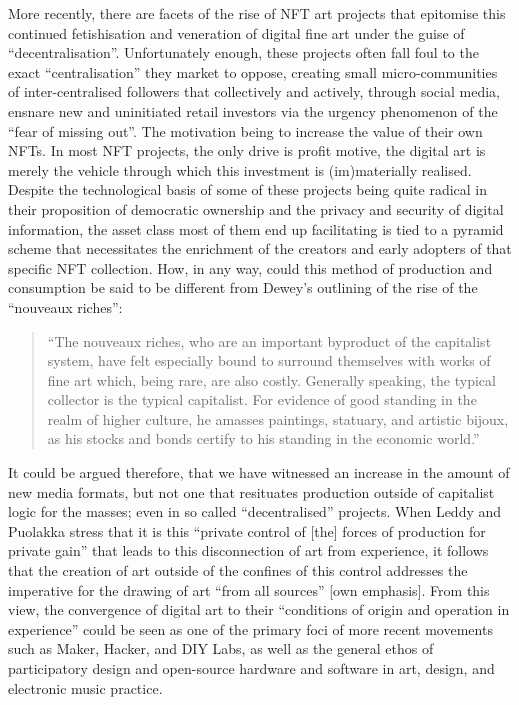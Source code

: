 More recently, there are facets of the rise of NFT art projects that epitomise this continued fetishisation and veneration of digital fine art under the guise of “decentralisation”. Unfortunately enough, these projects often fall foul to the exact “centralisation” they market to oppose, creating small micro-communities of inter-centralised followers that collectively and actively, through social media, ensnare new and uninitiated retail investors via the urgency phenomenon of the “fear of missing out”. The motivation being to increase the value of their own NFTs. In most NFT projects, the only drive is profit motive, the digital art is merely the vehicle through which this investment is (im)materially realised. Despite the technological basis of some of these projects being quite radical in their proposition of democratic ownership and the privacy and security of digital information, the asset class most of them end up facilitating is tied to a pyramid scheme that necessitates the enrichment of the creators and early adopters of that specific NFT collection. How, in any way, could this method of production and consumption be said to be different from Dewey’s outlining of the rise of the “nouveaux riches”:
\begin{quote}
    “The nouveaux riches, who are an important byproduct of the capitalist system, have felt especially bound to surround themselves with works of fine art which, being rare, are also costly. Generally speaking, the typical collector is the typical capitalist. For evidence of good standing in the realm of higher culture, he amasses paintings, statuary, and artistic bijoux, as his stocks and bonds certify to his standing in the economic world.” \citeyearpar[p. 7]{dewey1934}
\end{quote}
It could be argued therefore, that we have witnessed an increase in the amount of new media formats, but not one that resituates production outside of capitalist logic for the masses; even in so called “decentralised” projects. When Leddy and Puolakka stress that it is this “private control of [the] forces of production for private gain” that leads to this disconnection of art from experience, it follows that the creation of art outside of the confines of this control addresses the imperative for the drawing of art “from all sources” [own emphasis]. From this view, the convergence of digital art to their “conditions of origin and operation in experience” could be seen as one of the primary foci of more recent movements such as Maker, Hacker, and DIY Labs, as well as the general ethos of participatory design and open-source hardware and software in art, design, and electronic music practice.

